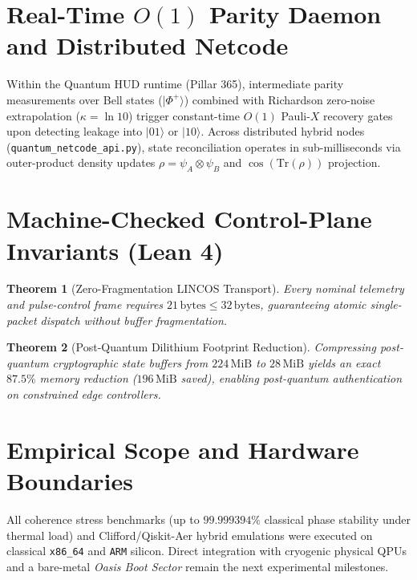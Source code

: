\documentclass[11pt,a4paper]{article}
\newtheorem{theorem}{Theorem}
\begin{document}
\section{Real-Time $O(1)$ Parity Daemon and Distributed Netcode}
Within the Quantum HUD runtime (Pillar 365), intermediate parity measurements over Bell states ($|\Phi^+\rangle$) combined with Richardson zero-noise extrapolation ($\kappa = \ln 10$) trigger constant-time $O(1)$ Pauli-$X$ recovery gates upon detecting leakage into $|01\rangle$ or $|10\rangle$. Across distributed hybrid nodes (\texttt{quantum\_netcode\_api.py}), state reconciliation operates in sub-milliseconds via outer-product density updates $\rho = \psi_A \otimes \psi_B$ and $\cos(\mathrm{Tr}(\rho))$ projection.

\section{Machine-Checked Control-Plane Invariants (Lean 4)}
\begin{theorem}[Zero-Fragmentation LINCOS Transport]
Every nominal telemetry and pulse-control frame requires $21\,\mathrm{bytes} \le 32\,\mathrm{bytes}$, guaranteeing atomic single-packet dispatch without buffer fragmentation.
\end{theorem}

\begin{theorem}[Post-Quantum Dilithium Footprint Reduction]
Compressing post-quantum cryptographic state buffers from $224\,\mathrm{MiB}$ to $28\,\mathrm{MiB}$ yields an exact $87.5\%$ memory reduction ($196\,\mathrm{MiB}$ saved), enabling post-quantum authentication on constrained edge controllers.
\end{theorem}

\section{Empirical Scope and Hardware Boundaries}
All coherence stress benchmarks (up to $99.999394\%$ classical phase stability under thermal load) and Clifford/Qiskit-Aer hybrid emulations were executed on classical \texttt{x86\_64} and \texttt{ARM} silicon. Direct integration with cryogenic physical QPUs and a bare-metal \emph{Oasis Boot Sector} remain the next experimental milestones.
\end{document}
